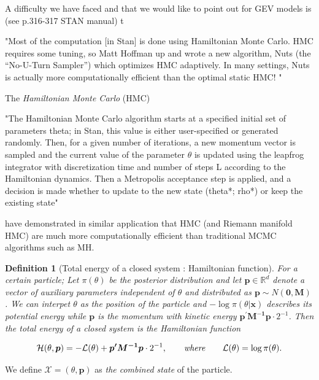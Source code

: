 \documentclass[11pt,a4paper,openany ]{book}
\newtheorem{definition}{Definition}[chapter]
\begin{document}
A difficulty we have faced and that we would like to point out for GEV models is (see p.316-317 STAN manual) t




"Most of the computation [in Stan] is done using Hamiltonian Monte Carlo. HMC requires some tuning, so Matt Hoffman up and wrote a new algorithm, Nuts (the “No-U-Turn Sampler”) which optimizes HMC adaptively. In many settings, Nuts is actually more computationally efficient than the optimal static HMC! "

The \emph{Hamiltonian Monte Carlo} (HMC)

"The Hamiltonian Monte Carlo algorithm starts at a specified initial set of parameters
theta; in Stan, this value is either user-specified or generated randomly. Then, for a given
number of iterations, a new momentum vector is sampled and the current value of
the parameter $\theta$ is updated using the leapfrog integrator with discretization time 
and number of steps L according to the Hamiltonian dynamics. Then a Metropolis
acceptance step is applied, and a decision is made whether to update to the new state
(theta*; rho*) or keep the existing state" \cite{stan_stan_2016}



\cite{Hartmann_bayesian_2016} have demonstrated in similar application that HMC  (and Riemann manifold HMC) are much more computationally efficient than traditional MCMC algorithms such as MH. 

\begin{definition}[Total energy of a closed system : Hamiltonian function]
	For a certain particle; Let $\pi(\theta)$ be the posterior distribution and let $\boldsymbol{p}\in\mathbb{R}^d$ denote a vector of auxiliary parameters independent of $\theta$ and distributed as $\boldsymbol{p}\sim N(\boldsymbol{0},\boldsymbol{M})$. We can interpet $\theta$ as the position of the particle and $-\log\pi(\theta|\boldsymbol{x})$ describes its potential energy while $\boldsymbol{p}$ is the momentum with kinetic energy $\boldsymbol{p^{'}M^{-1}p}\cdot2^{-1}$. Then the total energy of a closed system is the Hamiltonian function 
	
	\begin{equation}
	\mathcal{H}(\theta,\boldsymbol{p})=-\mathcal{L}(\theta)+\boldsymbol{p'M^{-1}p}\cdot 2^{-1}, \qquad\text{\emph{where}}\qquad \mathcal{L}(\theta)=\log\pi(\theta).
	\end{equation}
\end{definition}

 We define $\mathcal{X} = (\theta, \boldsymbol{p})$ as \emph{the combined state} of the particle.
 
\end{document}
